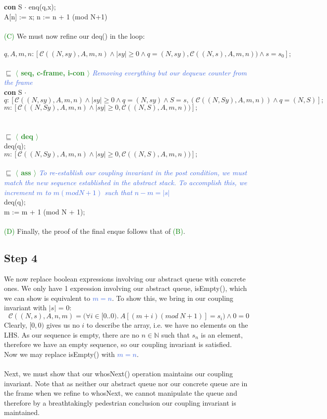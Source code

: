 \documentclass[a4paper]{scrartcl}
\newcommand{\N}{\mathbb{N}}
\newcommand{\C}{\mathcal{C}}
\newcommand{\refinedby}{\sqsubseteq} %
\newcommand{\rc}[1]{ $\refinedby$ \quad \textbf{\textcolor{ForestGreen}{$\langle$ #1 $\rangle$}}}
\newcommand{\explain}[1]{\textcolor{RoyalBlue}{\textit{#1}}}
\newcommand{\ab}[1]{\textcolor{WildStrawberry}{#1}}
\newcommand{\con}[1]{\textcolor{RoyalBlue}{#1}}
\begin{document}
{\textbf{con } S $\cdot$ enq(q,x);\\
A[n] := x; n := n + 1 (mod N+1) \\ \\
%
%
\textcolor{green}{(C)}
We must now refine our deq() in the loop: \\ \\
%
$ q, A, m, n : [\C((N,sy),A,m,n) \land |sy| \geq 0 \land q = (N,sy), \C((N,s),A,m,n)) \land s= s_0 ];$ \\  \\
%
\rc{seq, c-frame, i-con} \explain{Removing everything but our dequeue counter from the frame}\\
\textbf{con} S $\cdot$
$ q : [\C((N,sy),A,m,n) \land |sy| \geq 0 \land q = (N, sy) \land S = s, (\C((N,Sy),A,m,n)) \land q = (N,S) ];$ \\
$ m : [\C((N,Sy),A,m,n) \land |sy| \geq 0, \C((N,S),A,m,n)) ];$ \\ \\ \\
%
\rc{deq} \\
deq(q); \\
$ m : [\C((N,Sy),A,m,n) \land |sy| \geq 0, \C((N,S),A,m,n)) ];$ \\ \\
%
\rc{ass} \explain{To re-establish our coupling invariant in the post condition, we must match the new sequence established in the abstract stack. To accomplish this, we increment $m$ to $m (mod N+1)$ such that $n-m = |s|$} \\
deq(q); \\
m := m + 1 (mod N + 1); \\ \\
%
\textcolor{green}{(D)} Finally, the proof of the final enque follows that of \textcolor{green}{(B)}.
%
\subsection{Step 4}
We now replace boolean expressions involving our abstract queue with concrete ones. We only have 1 expression involving our abstract queue, \ab{isEmpty()}, which we can show is equivalent to \con{$m = n$}. To show this, we bring in our coupling invariant with $|s|$ = 0:
\[ \C((N, s), A, n, m) = \Big( \forall i \in [0..0). ~A[(m + i)(mod ~N + 1)] = s_i\Big) \land 0 = 0 \]
%
Clearly, $[0,0)$ gives us no $i$ to describe the array, i.e. we have no elements on the LHS. As our sequence is empty, there are no $n \in \N$ such that $s_n$ is an element, therefore we have an empty sequence, so our coupling invariant is satisfied.\\
%
\noindent
Now we may replace \ab{isEmpty()} with \con{$m = n$}. \\ \\
%
\noindent
Next, we must show that our whosNext() operation maintains our coupling invariant.
%
Note that as neither our abstract queue nor our concrete queue are in the frame when we refine to whosNext, we cannot manipulate the queue and therefore by a breathtakingly pedestrian conclusion our coupling invariant is maintained.
%
}
\end{document}
